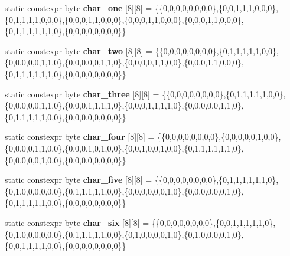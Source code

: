 \begin{DoxyCompactItemize}
\item 
static constexpr byte {\bfseries char\+\_\+one} \mbox{[}8\mbox{]}\mbox{[}8\mbox{]} = \{\{0,0,0,0,0,0,0,0\},\{0,0,1,1,1,0,0,0\},\{0,1,1,1,1,0,0,0\},\{0,0,0,1,1,0,0,0\},\{0,0,0,1,1,0,0,0\},\{0,0,0,1,1,0,0,0\},\{0,1,1,1,1,1,1,0\},\{0,0,0,0,0,0,0,0\}\}\hypertarget{classcharacters_ae8d72688158d59b1641a01ba8f8c3550}{}\label{classcharacters_ae8d72688158d59b1641a01ba8f8c3550}

\item 
static constexpr byte {\bfseries char\+\_\+two} \mbox{[}8\mbox{]}\mbox{[}8\mbox{]} = \{\{0,0,0,0,0,0,0,0\},\{0,1,1,1,1,1,0,0\},\{0,0,0,0,0,1,1,0\},\{0,0,0,0,0,1,1,0\},\{0,0,0,0,1,1,0,0\},\{0,0,0,1,1,0,0,0\},\{0,1,1,1,1,1,1,0\},\{0,0,0,0,0,0,0,0\}\}\hypertarget{classcharacters_a950bf448d32e6d13f4ac9011cbf99c22}{}\label{classcharacters_a950bf448d32e6d13f4ac9011cbf99c22}

\item 
static constexpr byte {\bfseries char\+\_\+three} \mbox{[}8\mbox{]}\mbox{[}8\mbox{]} = \{\{0,0,0,0,0,0,0,0\},\{0,1,1,1,1,1,0,0\},\{0,0,0,0,0,1,1,0\},\{0,0,0,1,1,1,1,0\},\{0,0,0,1,1,1,1,0\},\{0,0,0,0,0,1,1,0\},\{0,1,1,1,1,1,0,0\},\{0,0,0,0,0,0,0,0\}\}\hypertarget{classcharacters_a23a4d5fd0a3b0e361b22d5e204213268}{}\label{classcharacters_a23a4d5fd0a3b0e361b22d5e204213268}

\item 
static constexpr byte {\bfseries char\+\_\+four} \mbox{[}8\mbox{]}\mbox{[}8\mbox{]} = \{\{0,0,0,0,0,0,0,0\},\{0,0,0,0,0,1,0,0\},\{0,0,0,0,1,1,0,0\},\{0,0,0,1,0,1,0,0\},\{0,0,1,0,0,1,0,0\},\{0,1,1,1,1,1,1,0\},\{0,0,0,0,0,1,0,0\},\{0,0,0,0,0,0,0,0\}\}\hypertarget{classcharacters_a52265718ec3f364c0a29de5e00600afb}{}\label{classcharacters_a52265718ec3f364c0a29de5e00600afb}

\item 
static constexpr byte {\bfseries char\+\_\+five} \mbox{[}8\mbox{]}\mbox{[}8\mbox{]} = \{\{0,0,0,0,0,0,0,0\},\{0,1,1,1,1,1,1,0\},\{0,1,0,0,0,0,0,0\},\{0,1,1,1,1,1,0,0\},\{0,0,0,0,0,0,1,0\},\{0,0,0,0,0,0,1,0\},\{0,1,1,1,1,1,0,0\},\{0,0,0,0,0,0,0,0\}\}\hypertarget{classcharacters_aef272ee4bb3785ddff048bc982041084}{}\label{classcharacters_aef272ee4bb3785ddff048bc982041084}

\item 
static constexpr byte {\bfseries char\+\_\+six} \mbox{[}8\mbox{]}\mbox{[}8\mbox{]} = \{\{0,0,0,0,0,0,0,0\},\{0,0,1,1,1,1,1,0\},\{0,1,0,0,0,0,0,0\},\{0,1,1,1,1,1,0,0\},\{0,1,0,0,0,0,1,0\},\{0,1,0,0,0,0,1,0\},\{0,0,1,1,1,1,0,0\},\{0,0,0,0,0,0,0,0\}\}\hypertarget{classcharacters_a8296121b7408c5565de19cc776571f42}{}\label{classcharacters_a8296121b7408c5565de19cc776571f42}


\end{DoxyCompactItemize}
